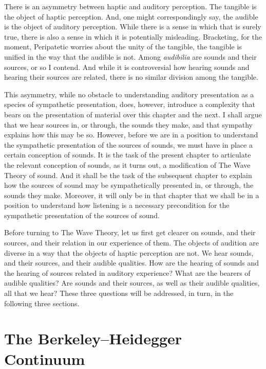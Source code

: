 There is an asymmetry between haptic and auditory perception. The tangible is the object of haptic perception. And, one might correspondingly say, the audible is the object of auditory perception. While there is a sense in which that is surely true, there is also a sense in which it is potentially misleading. Bracketing, for the moment, Peripatetic worries about the unity of the tangible, the tangible is unified in the way that the audible is not. Among \emph{audibilia} are sounds and their sources, or so I contend. And while it is controversial how hearing sounds and hearing their sources are related, there is no similar division among the tangible.

This asymmetry, while no obstacle to understanding auditory presentation as a species of sympathetic presentation, does, however, introduce a complexity that bears on the presentation of material over this chapter and the next. I shall argue that we hear sources in, or through, the sounds they make, and that sympathy explains how this may be so. However, before we are in a position to understand the sympathetic presentation of the sources of sounds, we must have in place a certain conception of sounds. It is the task of the present chapter to articulate the relevant conception of sounds, as it turns out, a modification of The Wave Theory of sound. And it shall be the task of the subsequent chapter to explain how the sources of sound may be sympathetically presented in, or through, the sounds they make. Moreover, it will only be in that chapter that we shall be in a position to understand how listening is a necessary precondition for the sympathetic presentation of the sources of sound.

Before turning to The Wave Theory, let us first get clearer on sounds, and their sources, and their relation in our experience of them. The objects of audition are diverse in a way that the objects of haptic perception are not. We hear sounds, and their sources, and their audible qualities. How are the hearing of sounds and the hearing of sources related in auditory experience? What are the bearers of audible qualities? Are sounds and their sources, as well as their audible qualities, all that we hear? These three questions will be addressed, in turn, in the following three sections.


\section{The Berkeley--Heidegger Continuum} %
\label{sec:the_berkeley_heidegger_continuum}

